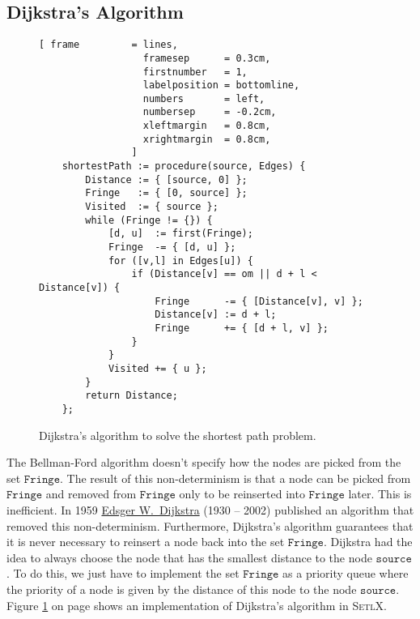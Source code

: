 \subsection{Dijkstra's Algorithm}
\begin{figure}[!ht]
\centering
\begin{Verbatim}[ frame         = lines, 
                  framesep      = 0.3cm, 
                  firstnumber   = 1,
                  labelposition = bottomline,
                  numbers       = left,
                  numbersep     = -0.2cm,
                  xleftmargin   = 0.8cm,
                  xrightmargin  = 0.8cm,
                ]
    shortestPath := procedure(source, Edges) {
        Distance := { [source, 0] };
        Fringe   := { [0, source] };
        Visited  := { source };
        while (Fringe != {}) {
            [d, u]  := first(Fringe);
            Fringe  -= { [d, u] };
            for ([v,l] in Edges[u]) {
                if (Distance[v] == om || d + l < Distance[v]) {
                    Fringe      -= { [Distance[v], v] };
                    Distance[v] := d + l;
                    Fringe      += { [d + l, v] };
                }
            }
            Visited += { u };
        }
        return Distance;
    };
\end{Verbatim}
\vspace*{-0.3cm}
\caption{Dijkstra's algorithm to solve the shortest path problem.}
\label{fig:dijkstra.stlx}
\end{figure}

\noindent
The Bellman-Ford algorithm doesn't specify how the nodes are picked from the set $\mathtt{Fringe}$.
The result of this non-determinism is that a node can be picked from $\mathtt{Fringe}$ and removed from
$\mathtt{Fringe}$ only to be reinserted into $\mathtt{Fringe}$ later.  This is inefficient.
In 1959 \href{https://en.wikipedia.org/wiki/Edsger_W._Dijkstra}{Edsger W.~Dijkstra} (1930 -- 2002) \cite{dijkstra:59}
published an algorithm that removed this non-determinism.  Furthermore, Dijkstra's algorithm guarantees that it
is never necessary to reinsert a node back into the set $\mathtt{Fringe}$.  Dijkstra had the idea to always choose
the node that has the smallest distance to the node $\mathtt{source}$.  To do this, we just have to
implement the set  $\mathtt{Fringe}$ as a priority queue where the priority of a node is given by the
distance of this node to the node $\mathtt{source}$.  Figure \ref{fig:dijkstra.stlx} on page
\pageref{fig:dijkstra.stlx} shows an implementation of Dijkstra's algorithm in \textsc{SetlX}.

